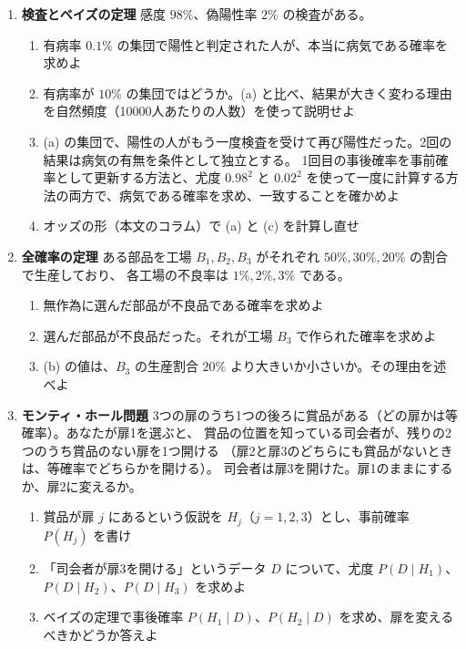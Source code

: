 \begin{enumerate}
  \item \textbf{検査とベイズの定理}\quad
    感度 $98\%$、偽陽性率 $2\%$ の検査がある。
    \begin{enumerate}
      \item 有病率 $0.1\%$ の集団で陽性と判定された人が、本当に病気である確率を求めよ
      \item 有病率が $10\%$ の集団ではどうか。(a) と比べ、結果が大きく変わる理由を自然頻度（10000人あたりの人数）を使って説明せよ
      \item (a) の集団で、陽性の人がもう一度検査を受けて再び陽性だった。2回の結果は病気の有無を条件として独立とする。
        1回目の事後確率を事前確率として更新する方法と、尤度 $0.98^2$ と $0.02^2$ を使って一度に計算する方法の両方で、病気である確率を求め、一致することを確かめよ
      \item オッズの形（本文のコラム）で (a) と (c) を計算し直せ
    \end{enumerate}

  \item \textbf{全確率の定理}\quad
    ある部品を工場 $B_1, B_2, B_3$ がそれぞれ $50\%, 30\%, 20\%$ の割合で生産しており、
    各工場の不良率は $1\%, 2\%, 3\%$ である。
    \begin{enumerate}
      \item 無作為に選んだ部品が不良品である確率を求めよ
      \item 選んだ部品が不良品だった。それが工場 $B_3$ で作られた確率を求めよ
      \item (b) の値は、$B_3$ の生産割合 $20\%$ より大きいか小さいか。その理由を述べよ
    \end{enumerate}

  \item \textbf{モンティ・ホール問題}\quad
    3つの扉のうち1つの後ろに賞品がある（どの扉かは等確率）。あなたが扉1を選ぶと、
    賞品の位置を知っている司会者が、残りの2つのうち賞品のない扉を1つ開ける
    （扉2と扉3のどちらにも賞品がないときは、等確率でどちらかを開ける）。
    司会者は扉3を開けた。扉1のままにするか、扉2に変えるか。
    \begin{enumerate}
      \item 賞品が扉 $j$ にあるという仮説を $H_j$（$j = 1, 2, 3$）とし、事前確率 $P(H_j)$ を書け
      \item 「司会者が扉3を開ける」というデータ $D$ について、尤度 $P(D \mid H_1)$、$P(D \mid H_2)$、$P(D \mid H_3)$ を求めよ
      \item ベイズの定理で事後確率 $P(H_1 \mid D)$、$P(H_2 \mid D)$ を求め、扉を変えるべきかどうか答えよ
    \end{enumerate}


\end{enumerate}
